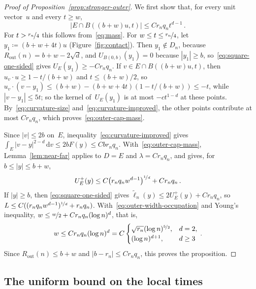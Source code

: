 \documentclass[11pt]{amsart}
\theoremstyle{plain}
\theoremstyle{definition}
\newcommand{\dd}{\,\mathrm d}
\newcommand{\nf}{\nicefrac}
\newcommand{\Rout}{R_{\mathrm{out}}}
\numberwithin{equation}{section}
\begin{document}
\begin{proof}[Proof of Proposition~\ref{prop:stronger-outer}]
We first show that, for every unit vector~$u$ and every $t\geq w$,
\begin{equation}\label{eq:outer-cap-mass}
|E\cap B((b+w)u,t)|\leq Cr_nq_n t^{d-1}\, .
\end{equation}
For $t>\nf{r_n}4$ this follows from~\eqref{eq:mass}. For $w\leq t\leq\nf{r_n}4$, let $y_1\coloneqq(b+w+4t)u$ (Figure~\ref{fig:contact}). Then $y_1\notin D_n$, because $\Rout(n)=b+w-2\sqrt d$, and $U_{B(0,b)}(y_1)=0$ because $|y_1|\geq b$, so~\eqref{eq:square-one-sided} gives $U_E(y_1)\geq-Cr_nq_n$. If $v\in E\cap B((b+w)u,t)$, then $u_v\cdot u\geq1-t/(b+w)$ and $t\leq(b+w)/2$, so $u_v\cdot(v-y_1)\leq(b+w)-(b+w+4t)(1-t/(b+w))\leq-t$, while $|v-y_1|\leq5t$; so the kernel of~$U_E(y_1)$ is at most $-ct^{1-d}$ at these points. By~\eqref{eq:curvature-size} and~\eqref{eq:curvature-improved}, the other points contribute at most $Cr_nq_n$, which proves~\eqref{eq:outer-cap-mass}.

Since $|v|\leq2b$ on~$E$, inequality~\eqref{eq:curvature-improved} gives $\int_E|v-y|^{2-d}\dd v\leq2bF(y)\leq Cbr_nq_n$. With~\eqref{eq:outer-cap-mass}, Lemma~\ref{lem:near-far} applies to $D=E$ and $\lambda=Cr_nq_n$, and gives, for $b\leq|y|\leq b+w$,
\begin{equation}\label{eq:positive-bound}
U_E^+(y)\leq C\bigl(r_nq_n w^{d-1}\bigr)^{\nf1d}+Cr_nq_n\, .
\end{equation}
If $|y|\geq b$, then \eqref{eq:square-one-sided} gives $\widetilde\ell_n(y)\leq2U_E^+(y)+Cr_nq_n$, so $L\leq C((r_nq_nw^{d-1})^{\nf1d}+r_nq_n)$. With~\eqref{eq:outer-width-occupation} and Young's inequality, $w\leq\nf w2+Cr_nq_n(\log n)^d$, that is,
\begin{equation}\label{eq:outer-reduction}
w\leq Cr_nq_n(\log n)^d=C\begin{cases}\sqrt{r_n}(\log n)^{\nf52},&d=2,\\(\log n)^{d+1},&d\geq3\end{cases}\, .
\end{equation}
Since $\Rout(n)\leq b+w$ and $|b-r_n|\leq Cr_nq_n$, this proves the proposition.
\end{proof}

\subsection{The uniform bound on the local times}\label{sec:global-profile}
\end{document}
